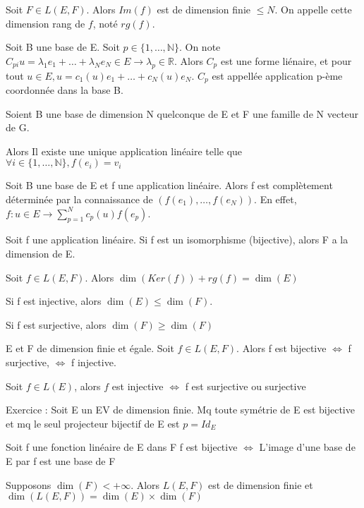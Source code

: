 \documentclass[french]{yLectureNote}
\newcommand{\N}[0]{\mathbb{N}}
\newcommand{\R}[0]{\mathbb{R}}
\begin{document}
\begin{proposition}
Soit \(F\in L(E,F)\). Alors \(Im(f)\) est de dimension finie \(\leq N\). On appelle cette dimension rang de \(f\), noté \(rg(f)\).
\end{proposition}
\begin{definition}
Soit B une base de E. Soit \(p\in \{1,\dots,\N\}\). On note \(C_{pi}u = \lambda_1e_1+\dots+\lambda_Ne_N \in E \to \lambda_p\in \R\). Alors \(C_p\) est une forme liénaire, et pour tout \(u\in E, u = c_1(u)e_1+\dots+c_N(u)e_N\). \(C_p\) est appellée application p-ème coordonnée dans la base B.
\end{definition}
\begin{theorem}[]
 Soient B une base de dimension N quelconque de E et F une famille de N vecteur de G.

 Alors Il existe une unique application linéaire telle que \(\forall i \in \{1,\dots,\N\}, f(e_i) = v_i\)
\end{theorem}
\begin{proposition}[Corollaire]
Soit B une base de E et f une application linéaire. Alors f est complètement déterminée par la connaissance de \((f(e_1),\dots,f(e_N))\). En effet, \(f : u\in E \to \sum_{p=1}^N c_p(u)f(e_p)\).
\end{proposition}
\begin{proposition}
Soit f une application linéaire. Si f est un isomorphisme (bijective), alors F a la dimension de E.
\end{proposition}
\begin{theorem}
 Soit \(f\in L(E,F)\). Alors \(\dim(Ker(f))+rg(f) = \dim(E)\)
\end{theorem}
\begin{proposition}
Si f est injective, alors \(\dim(E)\leq \dim(F)\).

Si f est surjective, alors \(\dim(F)\geq \dim(F)\)
\end{proposition}

\begin{proposition}[Corollaire]
E et F de dimension finie et égale. Soit \(f\in L(E,F)\). Alors f est bijective \(\iff\) f surjective, \(\iff\) f injective.
\end{proposition}
\begin{proposition}[Cororllaire]
Soit \(f\in L(E)\), alors \(f\) est injective \(\iff\) f est surjective ou surjective
\end{proposition}
Exercice : Soit E un EV de dimension finie. Mq toute symétrie de E est bijective et mq le seul projecteur bijectif de E est \(p=Id_E\)
\begin{proposition}
Soit f une fonction linéaire de E dans F
f est bijective \(\iff \) L'image d'une base de E par f est une base de F
\end{proposition}
\begin{proposition}
Supposons \(\dim(F)< +\infty\). Alors \(L(E,F)\) est de dimension finie et \(\dim(L(E,F)) = \dim(E)\times \dim(F)\)
\end{proposition}
\end{document}
